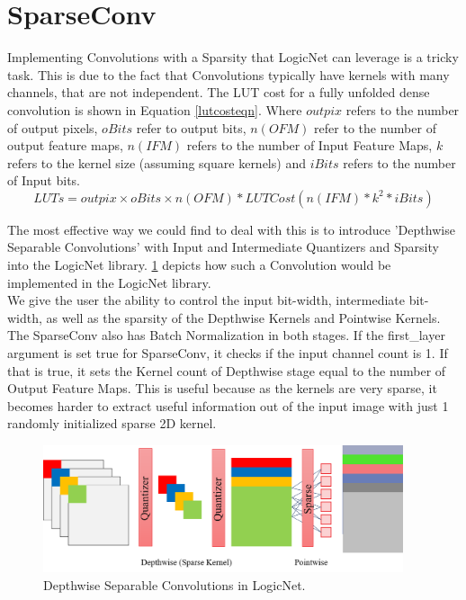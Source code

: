 \section{SparseConv}
Implementing Convolutions with a Sparsity that LogicNet can leverage is a tricky task. This is due to the fact that Convolutions typically have kernels with many channels, that are not independent. The LUT cost for a fully unfolded dense convolution is shown in Equation \eqref{lutcosteqn}. Where $outpix$ refers to the number of output pixels, $oBits$ refer to output bits, $n(OFM)$ refer to the number of output feature maps, $n(IFM)$ refers to the number of Input Feature Maps, $k$ refers to the kernel size (assuming square kernels) and $iBits$ refers to the number of Input bits.
\begin{equation}
    LUTs = outpix\times oBits \times n(OFM) * LUTCost(n(IFM)*k^{2}*iBits)
    \label{lutcosteqn}
\end{equation}

The most effective way we could find to deal with this is to introduce 'Depthwise Separable Convolutions' with Input and Intermediate Quantizers and Sparsity into the LogicNet library. \cref{fig:dwsepconv} depicts how such a Convolution would be implemented in the LogicNet library.\\

We give the user the ability to control the input bit-width, intermediate bit-width, as well as the sparsity of the Depthwise Kernels and Pointwise Kernels. The SparseConv also has Batch Normalization in both stages.
If the first\_layer argument is set true for SparseConv, it checks if the input channel count is 1. If that is true, it sets the Kernel count of Depthwise stage equal to the number of Output Feature Maps. This is useful because as the kernels are very sparse, it becomes harder to extract useful information out of the input image with just 1 randomly initialized sparse 2D kernel.

\begin{figure}[h]
    \centering
    \includegraphics[width=300pt]{figures/bison/dwsepconv.png}
    \caption{Depthwise Separable Convolutions in LogicNet.}
    \label{fig:dwsepconv}
\end{figure}

